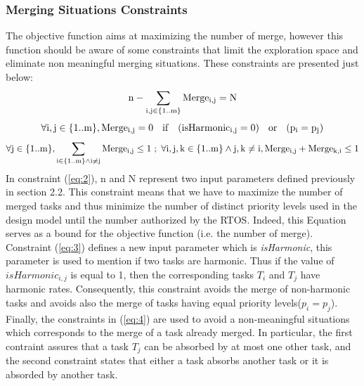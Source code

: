 \documentclass[runningheads,a4paper]{llncs}
\begin{document}
\subsubsection{Merging Situations Constraints}
The objective function aims at maximizing the number of merge, however this function should be aware of some constraints that limit the exploration space and eliminate non meaningful merging situations. These constraints are presented just below: 
\begin{equation}
\footnotesize{\mathrm{n - \sum_{i,j \in \{1..m \}}{Merge_{i,j}} = N}}
\label{eq:2}
\end{equation}
\begin{equation}
\footnotesize{\mathrm{\forall{i,j \in \{1..m\}}, Merge_{i,j} =0 \quad if \quad (isHarmonic_{i,j}=0) \quad or \quad (p_{i} =p_{j})} }
\label{eq:3}
\end{equation}
\begin{equation}
\footnotesize{\mathrm{\forall{j \in \{1..m\}}, \sum_{i\in \{1..m\} \wedge  i  \neq j } Merge_{i,j} \leq 1}} \ ; \ \footnotesize{\mathrm{\forall{i,j,k \in \{1..m\} \wedge j,k  \neq i }, Merge_{i,j} +  Merge_{k,i} \leq 1} } 
\label{eq:4}
\end{equation}
In constraint (\ref{eq:2}), n and N represent two input parameters defined previously in section 2.2. This constraint means that we have to maximize the number of merged tasks and thus minimize the number of distinct priority levels used in the design model until the number authorized by the RTOS. Indeed, this Equation serves as a bound for the objective function (i.e. the number of merge). Constraint (\ref{eq:3}) defines a new input parameter which is \emph{isHarmonic}, this parameter is used to mention if two tasks are harmonic. Thus if the value of $isHarmonic_{i,j}$  is equal to 1, then the corresponding tasks $T_i$ and $T_j$ have harmonic rates. Consequently, this constraint avoids the merge of non-harmonic tasks and avoids also the merge of tasks having equal priority levels($p_i=p_j$). Finally, the constraints in (\ref{eq:4}) are used to avoid a non-meaningful situations which corresponds to the merge of a task already merged. In particular, the first contraint assures that a task $T_j$ can be absorbed by at most one other task, and the second constraint states that either  a task absorbs another task or it is absorded by another task. 
\end{document}
